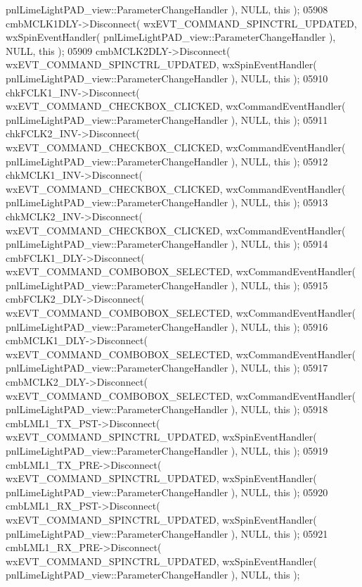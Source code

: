 \begin{DoxyCode}
      pnlLimeLightPAD_view::ParameterChangeHandler ), NULL, \textcolor{keyword}{this} );
05908     cmbMCLK1DLY->Disconnect( wxEVT\_COMMAND\_SPINCTRL\_UPDATED, wxSpinEventHandler( 
      pnlLimeLightPAD_view::ParameterChangeHandler ), NULL, \textcolor{keyword}{this} );
05909     cmbMCLK2DLY->Disconnect( wxEVT\_COMMAND\_SPINCTRL\_UPDATED, wxSpinEventHandler( 
      pnlLimeLightPAD_view::ParameterChangeHandler ), NULL, \textcolor{keyword}{this} );
05910     chkFCLK1_INV->Disconnect( wxEVT\_COMMAND\_CHECKBOX\_CLICKED, wxCommandEventHandler( 
      pnlLimeLightPAD_view::ParameterChangeHandler ), NULL, \textcolor{keyword}{this} );
05911     chkFCLK2_INV->Disconnect( wxEVT\_COMMAND\_CHECKBOX\_CLICKED, wxCommandEventHandler( 
      pnlLimeLightPAD_view::ParameterChangeHandler ), NULL, \textcolor{keyword}{this} );
05912     chkMCLK1_INV->Disconnect( wxEVT\_COMMAND\_CHECKBOX\_CLICKED, wxCommandEventHandler( 
      pnlLimeLightPAD_view::ParameterChangeHandler ), NULL, \textcolor{keyword}{this} );
05913     chkMCLK2_INV->Disconnect( wxEVT\_COMMAND\_CHECKBOX\_CLICKED, wxCommandEventHandler( 
      pnlLimeLightPAD_view::ParameterChangeHandler ), NULL, \textcolor{keyword}{this} );
05914     cmbFCLK1_DLY->Disconnect( wxEVT\_COMMAND\_COMBOBOX\_SELECTED, wxCommandEventHandler( 
      pnlLimeLightPAD_view::ParameterChangeHandler ), NULL, \textcolor{keyword}{this} );
05915     cmbFCLK2_DLY->Disconnect( wxEVT\_COMMAND\_COMBOBOX\_SELECTED, wxCommandEventHandler( 
      pnlLimeLightPAD_view::ParameterChangeHandler ), NULL, \textcolor{keyword}{this} );
05916     cmbMCLK1_DLY->Disconnect( wxEVT\_COMMAND\_COMBOBOX\_SELECTED, wxCommandEventHandler( 
      pnlLimeLightPAD_view::ParameterChangeHandler ), NULL, \textcolor{keyword}{this} );
05917     cmbMCLK2_DLY->Disconnect( wxEVT\_COMMAND\_COMBOBOX\_SELECTED, wxCommandEventHandler( 
      pnlLimeLightPAD_view::ParameterChangeHandler ), NULL, \textcolor{keyword}{this} );
05918     cmbLML1_TX_PST->Disconnect( wxEVT\_COMMAND\_SPINCTRL\_UPDATED, wxSpinEventHandler( 
      pnlLimeLightPAD_view::ParameterChangeHandler ), NULL, \textcolor{keyword}{this} );
05919     cmbLML1_TX_PRE->Disconnect( wxEVT\_COMMAND\_SPINCTRL\_UPDATED, wxSpinEventHandler( 
      pnlLimeLightPAD_view::ParameterChangeHandler ), NULL, \textcolor{keyword}{this} );
05920     cmbLML1_RX_PST->Disconnect( wxEVT\_COMMAND\_SPINCTRL\_UPDATED, wxSpinEventHandler( 
      pnlLimeLightPAD_view::ParameterChangeHandler ), NULL, \textcolor{keyword}{this} );
05921     cmbLML1_RX_PRE->Disconnect( wxEVT\_COMMAND\_SPINCTRL\_UPDATED, wxSpinEventHandler( 
      pnlLimeLightPAD_view::ParameterChangeHandler ), NULL, \textcolor{keyword}{this} );

\end{DoxyCode}
